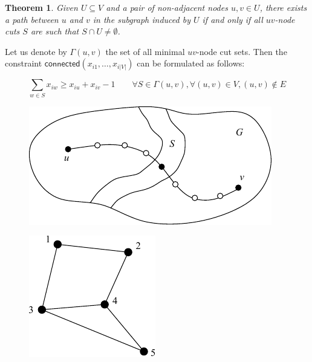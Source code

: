 \documentclass[]{article}
\newtheorem{theorem}{Theorem}
\begin{document}
\begin{theorem}
Given $U \subseteq V$ and a pair of non-adjacent nodes $u, v \in U$, there exists a path between $u$ and $v$ in the subgraph induced by $U$ if and only if all $uv$-node cuts $S$ are such that $S \cap U \neq \emptyset$.
\end{theorem}

Let us denote by $\Gamma(u, v)$ the set of all minimal $uv$-node cut sets. Then the constraint $\mathsf{connected}(x_{i1}, \ldots, x_{i|V|})$ can be formulated as follows:

\begin{equation}
\sum_{w \in S} x_{iw} \geq x_{iu} + x_{iv} - 1 \qquad \forall S \in \Gamma(u, v), \forall (u, v) \in V, (u, v) \notin E
\label{eq:connectivity}
\end{equation}

\begin{figure}
\centering
\begin{minipage}{.55\textwidth}
\centering
\includegraphics[scale=0.7]{node_cut}
\captionsetup{font=small,margin=10pt}
\label{fig:nodecut}
\end{minipage}%
\begin{minipage}{.45\textwidth}
\centering
\includegraphics[scale=0.8]{minimal}
\captionsetup{font=small, margin=10pt}
\label{fig:minimal}
\end{minipage}
\end{figure}
\end{document}
